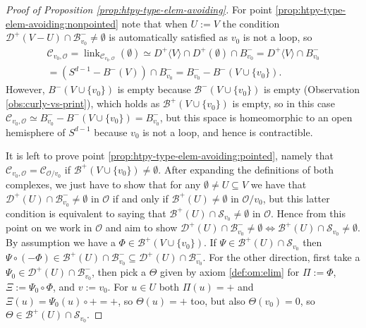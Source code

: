 \documentclass[10pt,a4paper]{amsart}
\DeclareMathOperator{\link}{\mathrm{link}}
\begin{document}
\begin{proof}[Proof of Proposition \ref{prop:htpy-type-elem-avoiding}]
    For point \ref{prop:htpy-type-elem-avoiding:nonpointed} note that when $U:=V$ the condition $\mathscr{D}^+(V-U)\cap\mathscr{B}^-_{v_0}\neq\emptyset$ is automatically satisfied as $v_0$ is not a loop, so 
    \begin{multline*}
    \mathscr{C}_{v_0,\mathscr{O}}=\link_{\mathscr{C}_{v_0,\mathscr{O}}}(\emptyset)\simeq D^+\langle V\rangle\cap D^+(\emptyset)\cap B^-_{v_0}=D^+\langle V\rangle\cap B^-_{v_0}\\ =(S^{d-1}-B^-(V))\cap B^-_{v_0}=B^-_{v_0}-B^-(V\cup\{v_0\}).	
    \end{multline*}
    However, $B^-(V\cup\{v_0\})$ is empty because $\mathscr{B}^-(V\cup\{v_0\})$ is empty (Observation \ref{obs:curly-vs-print}), which holds as $\mathscr{B}^+(V\cup\{v_0\})$ is empty, so in this case $\mathscr{C}_{v_0,\mathscr{O}}\simeq B^-_{v_0}-B^-(V\cup\{v_0\})=B^-_{v_0}$, but this space is homeomorphic to an open hemisphere of $S^{d-1}$ because $v_0$ is not a loop, and hence is contractible.

    It is left to prove point \ref{prop:htpy-type-elem-avoiding:pointed}, namely that $\mathscr{C}_{v_0,\mathscr{O}}=\mathscr{C}_{\mathscr{O}/v_0}$ if $\mathscr{B}^+(V\cup\{v_0\})\neq\emptyset$.
    After expanding the definitions of both complexes, we just have to show that for any $\emptyset\neq U\subseteq V$ we have that $\mathscr{D}^+(U)\cap\mathscr{B}^-_{v_0}\neq\emptyset$ in $\mathscr{O}$ if and only if $\mathscr{B}^+(U)\neq\emptyset$ in $\mathscr{O}/v_0$, but this latter condition is equivalent to saying that $\mathscr{B}^+(U)\cap\mathscr{S}_{v_0}\neq\emptyset$ in $\mathscr{O}$. Hence from this point on we work in $\mathscr{O}$ and aim to show $\mathscr{D}^+(U)\cap\mathscr{B}^-_{v_0}\neq\emptyset\iff\mathscr{B}^+(U)\cap\mathscr{S}_{v_0}\neq\emptyset$.
    By assumption we have a $\Phi\in\mathscr{B}^+(V\cup\{v_0\})$. If $\Psi\in\mathscr{B}^+(U)\cap\mathscr{S}_{v_0}$ then $\Psi\circ(-\Phi)\in\mathscr{B}^+(U)\cap\mathscr{B}^-_{v_0}\subseteq\mathscr{D}^+(U)\cap\mathscr{B}^-_{v_0}$. For the other direction, first take a $\Psi_0\in\mathscr{D}^+(U)\cap\mathscr{B}^-_{v_0}$, then pick a $\Theta$ given by axiom \ref{def:om:elim} for $\Pi:=\Phi$, $\Xi:=\Psi_0\circ\Phi$, and $v:=v_0$. For $u\in U$ both $\Pi(u)=+$ and $\Xi(u)=\Psi_0(u)\circ+=+$, so $\Theta(u)=+$ too, but also $\Theta(v_0)=0$, so $\Theta\in\mathscr{B}^+(U)\cap\mathscr{S}_{v_0}$.
\end{proof}
\end{document}
